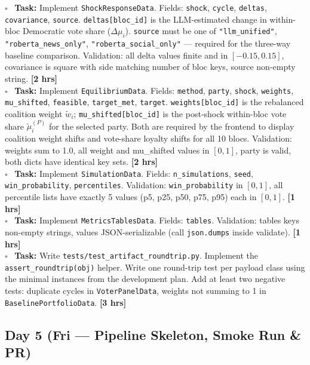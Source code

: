 \documentclass[11pt]{article}
\newcommand{\hrs}[1]{\textbf{[#1 hrs]}}
\newcommand{\dayhead}[2]{%
  \subsection*{Day #1 \normalfont\small\color{codegray}(#2)}}
\newcommand{\task}[2]{%
  \noindent\textbf{Task:} #1 \hfill \hrs{#2}\\}
\newcommand{\done}{\textcolor{sectionblue}{$\square$}\ }
\begin{document}
\begin{taskbox}
\done \task{Implement \texttt{ShockResponseData}. Fields: \texttt{shock},
  \texttt{cycle}, \texttt{deltas}, \texttt{covariance}, \texttt{source}.
  \texttt{deltas[bloc\_id]} is the LLM-estimated change in within-bloc
  Democratic vote share ($\Delta\mu_i$). \texttt{source} must be one of
  \texttt{"llm\_unified"}, \texttt{"roberta\_news\_only"},
  \texttt{"roberta\_social\_only"} --- required for the three-way baseline
  comparison. Validation: all delta values finite and in $[-0.15, 0.15]$,
  covariance is square with side matching number of bloc keys, source
  non-empty string.}{2}

\done \task{Implement \texttt{EquilibriumData}. Fields: \texttt{method},
  \texttt{party}, \texttt{shock}, \texttt{weights}, \texttt{mu\_shifted},
  \texttt{feasible}, \texttt{target\_met}, \texttt{target}.
  \texttt{weights[bloc\_id]} is the rebalanced coalition weight $\tilde{w}_i$;
  \texttt{mu\_shifted[bloc\_id]} is the post-shock within-bloc vote share
  $\tilde{\mu}_i^{(P)}$ for the selected party. Both are required by the
  frontend to display coalition weight shifts and vote-share loyalty shifts
  for all 10 blocs. Validation: weights sum to 1.0, all weight and
  mu\_shifted values in $[0,1]$, party is valid, both dicts have identical
  key sets.}{2}

\done \task{Implement \texttt{SimulationData}. Fields: \texttt{n\_simulations},
  \texttt{seed}, \texttt{win\_probability}, \texttt{percentiles}. Validation:
  \texttt{win\_probability} in $[0,1]$, all percentile lists have exactly
  5 values (p5, p25, p50, p75, p95) each in $[0,1]$.}{1}

\done \task{Implement \texttt{MetricsTablesData}. Fields: \texttt{tables}.
  Validation: tables keys non-empty strings, values JSON-serializable
  (call \texttt{json.dumps} inside validate).}{1}

\done \task{Write \texttt{tests/test\_artifact\_roundtrip.py}. Implement the
  \texttt{assert\_roundtrip(obj)} helper. Write one round-trip test per
  payload class using the minimal instances from the development plan.
  Add at least two negative tests: duplicate cycles in \texttt{VoterPanelData},
  weights not summing to 1 in \texttt{BaselinePortfolioData}.}{3}
\end{taskbox}

\dayhead{5}{Fri --- Pipeline Skeleton, Smoke Run \& PR}
\end{document}
